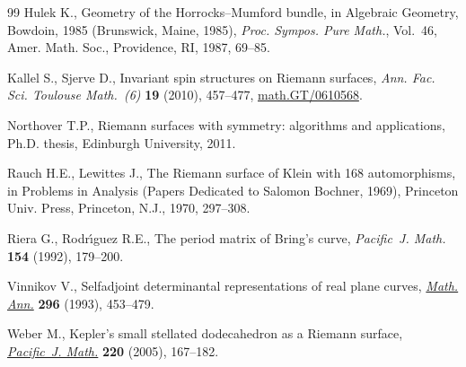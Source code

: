 \documentclass[pdftex]{sigma}
\numberwithin{equation}{section}
\begin{document}
\begin{thebibliography}{99}
Hulek K., Geometry of the {H}orrocks--{M}umford bundle, in Algebraic Geometry,
  {B}owdoin, 1985 ({B}runswick, {M}aine, 1985), \textit{Proc. Sympos. Pure
  Math.}, Vol.~46, Amer. Math. Soc., Providence, RI, 1987, 69--85.

Kallel S., Sjerve D., Invariant spin structures on {R}iemann surfaces,
  \textit{Ann. Fac. Sci. Toulouse Math.~(6)} \textbf{19} (2010), 457--477,
  \href{http://arxiv.org/abs/math.GT/0610568}{math.GT/0610568}.

Northover T.P., Riemann surfaces with symmetry: algorithms and applications,
  Ph.D. thesis, Edinburgh University, 2011.

Rauch H.E., Lewittes J., The {R}iemann surface of {K}lein with 168
  automorphisms, in Problems in Analysis (Papers Dedicated to {S}alomon
  {B}ochner, 1969), Princeton Univ. Press, Princeton, N.J., 1970, 297--308.

Riera G., Rodr{\'{\i}}guez R.E., The period matrix of {B}ring's curve,
  \textit{Pacific~J. Math.} \textbf{154} (1992), 179--200.

Vinnikov V., Selfadjoint determinantal representations of real plane curves,
  \href{http://dx.doi.org/10.1007/BF01445115}{\textit{Math. Ann.}} \textbf{296} (1993), 453--479.

Weber M., Kepler's small stellated dodecahedron as a {R}iemann surface,
  \href{http://dx.doi.org/10.2140/pjm.2005.220.167}{\textit{Pacific~J. Math.}} \textbf{220} (2005), 167--182.

\end{thebibliography}\LastPageEnding
\end{document}
